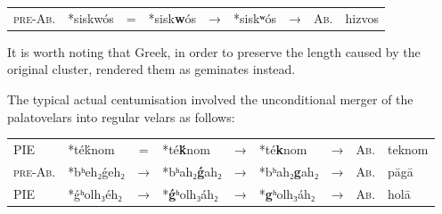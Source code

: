 \documentclass[svgnames,x11names,b5paper]{book}
\begin{document}
            \begin{table}[H]
                \begin{center}
                \begin{tabular}{llcllllll}
                \textsc{pre-Ab.} & *siskwós & = & *sisk\textbf{w}ós & → & *sisk\textbf{ʷ}ós & → & \textsc{Ab.} & hizvos\\
                \end{tabular}
                \end{center}
                \end{table}
        
            It is worth noting that Greek, in order to preserve the length caused by the original cluster, rendered them as geminates instead.

        The typical actual centumisation involved the unconditional merger of the palatovelars into regular velars as follows:

            \begin{table}[H]
                \begin{center}
                \begin{tabular}{llcllllll}
                \textsc{PIE} & *téḱnom & = & *té\textbf{ḱ}nom & → & *té\textbf{k}nom & → & \textsc{Ab.} & teknom\\
                \textsc{pre-Ab.} & *bʰeh₂ǵeh₂ & → & *bʰah₂\textbf{ǵ}ah₂ & → & *bʰah₂\textbf{g}ah₂ & → & \textsc{Ab.} & pāgā\\
                \textsc{PIE} & *ǵʰolh₃éh₂ & → & *\textbf{ǵ}ʰolh₃áh₂ & → & *\textbf{g}ʰolh₃áh₂ & → & \textsc{Ab.} & holā\\
                \end{tabular}
                \end{center}
                \end{table}
        
\end{document}
